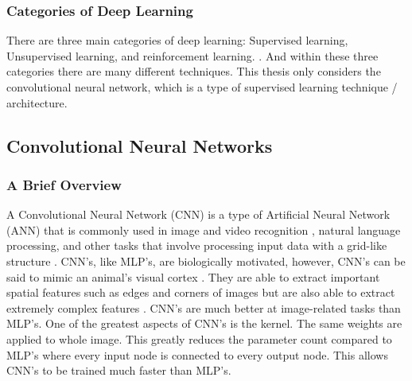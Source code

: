  \subsubsection*{Categories of Deep Learning}
 There are three main categories of deep learning: Supervised learning, Unsupervised learning, and reinforcement learning. \cite{alzubaidi2021review}. And within these three categories there are many different techniques. This thesis only considers the convolutional neural network, which is a type of supervised learning technique / architecture. 

\subsection{Convolutional Neural Networks}
\subsubsection*{A Brief Overview}
A Convolutional Neural Network (CNN) is a type of Artificial Neural Network (ANN) that is commonly used in image and video recognition , natural language processing, and other tasks that involve processing input data with a grid-like structure \cite{li2021survey}. CNN's, like MLP's, are biologically motivated, however, CNN's can be said to mimic an animal's visual cortex \cite{angermueller2016deep}. They are  able to extract important spatial features such as edges and corners of images but are also able to extract extremely complex features \cite{KATTENBORN202124}. CNN's are much better at image-related tasks than MLP's. One of the greatest aspects of CNN's is the kernel. The same weights are applied to whole image. This greatly reduces the parameter count compared to MLP's where every input node is connected to every output node. This allows CNN's to be trained much faster than MLP's.

